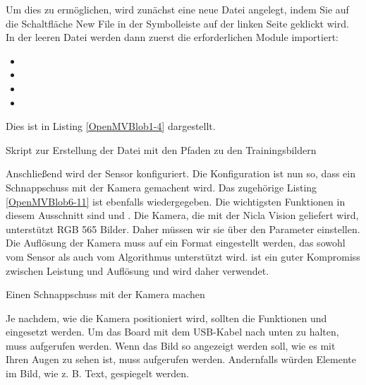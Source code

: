 Um dies zu ermöglichen, wird zunächst eine neue Datei angelegt, indem Sie auf die Schaltfläche \glqq New File\grqq{} in der Symbolleiste auf der linken Seite geklickt wird. In der leeren Datei werden dann zuerst die erforderlichen Module  importiert:

\begin{itemize}
	\item {}
	\item {}
	\item {}
	\item {}
\end{itemize}

Dies ist in Listing \ref{OpenMVBlob1-4} dargestellt.

\begin{code}
	
	\caption[Skript zur Erstellung der Datei ]{Skript zur Erstellung der Datei  mit den Pfaden zu den Trainingsbildern}\label{OpenMVBlob1-4}
\end{code}
	
Anschließend wird der Sensor konfiguriert. Die Konfiguration ist nun so, dass ein Schnappschuss mit der Kamera gemachent wird. Das zugehörige Listing \ref{OpenMVBlob6-11} ist ebenfalls wiedergegeben. Die wichtigsten Funktionen in diesem Ausschnitt sind  und . Die Kamera, die mit der Nicla Vision geliefert wird, unterstützt RGB 565 Bilder. Daher müssen wir sie über den Parameter  einstellen. 
Die Auflösung der Kamera muss auf ein Format eingestellt werden, das sowohl vom Sensor als auch vom Algorithmus unterstützt wird.  ist ein guter Kompromiss zwischen Leistung und Auflösung und wird daher verwendet.



\begin{code}
	
	\caption{Einen Schnappschuss mit der Kamera machen}\label{OpenMVBlob6-11}
\end{code}



Je nachdem, wie die Kamera positioniert wird, sollten die Funktionen  und  eingesetzt werden. Um das Board mit dem USB-Kabel nach unten zu halten, muss   aufgerufen werden. Wenn das Bild so angezeigt werden soll, wie es mit Ihren Augen zu sehen ist, muss  aufgerufen werden. Andernfalls würden Elemente im Bild, wie z. B. Text, gespiegelt werden.



